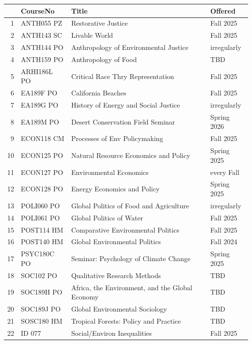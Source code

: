 \documentclass{article}\usepackage[]{graphicx}\usepackage[]{xcolor}
\begin{document}
\begin{description}
\begin{table}[ht]
\centering
\begin{tabular}{rlll}
  \hline
 & CourseNo & Title & Offered \\ 
  \hline
1 & ANTH055 PZ & Restorative Justice & Fall 2025 \\ 
  2 & ANTH143 SC & Livable World & Fall 2025 \\ 
  3 & ANTH144 PO & Anthropology of Environmental Justice & irregularly \\ 
  4 & ANTH159 PO & Anthropology of Food & TBD \\ 
  5 & ARHI186L PO & Critical Race Thry Representation & Fall 2025 \\ 
  6 & EA189F PO & California Beaches & Fall 2025 \\ 
  7 & EA189G PO & History of Energy and Social Justice & irregularly \\ 
  8 & EA189M PO & Desert Conservation Field Seminar & Spring 2026 \\ 
  9 & ECON118 CM & Processes of Env Policymaking & Fall 2025 \\ 
  10 & ECON125 PO & Natural Resource Economics and Policy & Spring 2025 \\ 
  11 & ECON127 PO & Environmental Economics & every  Fall \\ 
  12 & ECON128 PO & Energy Economics and Policy & Spring 2025 \\ 
  13 & POLI060 PO & Global Politics of Food and Agriculture & irregularly \\ 
  14 & POLI061 PO & Global Politics of Water & Fall 2025 \\ 
  15 & POST114 HM & Comparative Environmental Politics & Fall 2025 \\ 
  16 & POST140 HM & Global Environmental Politics & Fall 2024 \\ 
  17 & PSYC180C PO & Seminar: Psychology of Climate Change & Spring 2025 \\ 
  18 & SOC102 PO & Qualitative Research Methods & TBD \\ 
  19 & SOC189H PO & Africa, the Environment, and the Global Economy & TBD \\ 
  20 & SOC189J PO & Global Environmental Sociology & TBD \\ 
  21 & SOSC180 HM & Tropical Forests: Policy and Practice & TBD \\ 
  22 & ID 077 & Social/Environ Inequalities & Fall 2025 \\ 
   \hline
\end{tabular}
\end{table}



\end{description}
\end{document}
